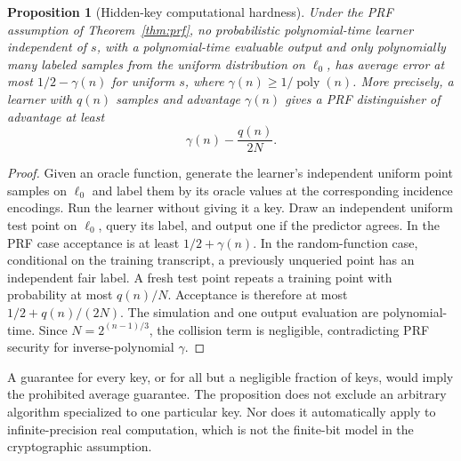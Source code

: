\documentclass[11pt]{article}
\newtheorem{proposition}[theorem]{Proposition}
\newcommand{\1}{\mathbf 1}
\begin{document}
\begin{samepage}
\begin{proposition}[Hidden-key computational hardness]\label{prop:hiddenkey}
Under the PRF assumption of Theorem~\ref{thm:prf}, no probabilistic polynomial-time learner independent of $s$, with a polynomial-time evaluable output and only polynomially many labeled samples from the uniform distribution on $\ell_0$, has average error at most $1/2-\gamma(n)$ for uniform $s$, where $\gamma(n)\ge1/\operatorname{poly}(n)$. More precisely, a learner with $q(n)$ samples and advantage $\gamma(n)$ gives a PRF distinguisher of advantage at least
\[
 \gamma(n)-\frac{q(n)}{2N}.
\]
\end{proposition}
\end{samepage}
\begin{proof}
Given an oracle function, generate the learner's independent uniform point samples on $\ell_0$ and label them by its oracle values at the corresponding incidence encodings. Run the learner without giving it a key. Draw an independent uniform test point on $\ell_0$, query its label, and output one if the predictor agrees. In the PRF case acceptance is at least $1/2+\gamma(n)$. In the random-function case, conditional on the training transcript, a previously unqueried point has an independent fair label. A fresh test point repeats a training point with probability at most $q(n)/N$. Acceptance is therefore at most $1/2+q(n)/(2N)$. The simulation and one output evaluation are polynomial-time. Since $N=2^{(n-1)/3}$, the collision term is negligible, contradicting PRF security for inverse-polynomial $\gamma$.
\end{proof}

A guarantee for every key, or for all but a negligible fraction of keys, would imply the prohibited average guarantee. The proposition does not exclude an arbitrary algorithm specialized to one particular key. Nor does it automatically apply to infinite-precision real computation, which is not the finite-bit model in the cryptographic assumption.
\end{document}
